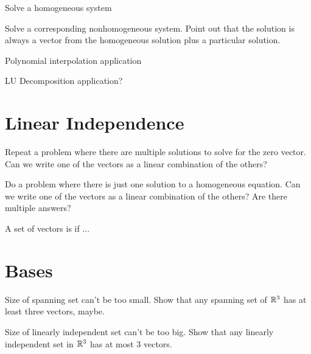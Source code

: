\begin{problemtodo}
  Solve a homogeneous system
\end{problemtodo}

\begin{problemtodo}
  Solve a corresponding nonhomogeneous system.  Point out that the
  solution is always a vector from the homogeneous solution plus a
  particular solution.
\end{problemtodo}

\begin{problemtodo}
  Polynomial interpolation application
\end{problemtodo}

\begin{problemtodo}
  LU Decomposition application?
\end{problemtodo}

\section{Linear Independence}

\begin{problemtodo}
  Repeat a problem where there are multiple solutions to solve for the
  zero vector.  Can we write one of the vectors as a linear
  combination of the others?
\end{problemtodo}

\begin{problemtodo}
  Do a problem where there is just one solution to a homogeneous
  equation.  Can we write one of the vectors as a linear combination
  of the others?  Are there multiple answers?
\end{problemtodo}

\begin{definition}
  A set of vectors is  if ...
\end{definition}

\section{Bases}

\begin{problemtodo}
  Size of spanning set can't be too small.  Show that any spanning set
  of $\mathbb{R}^3$ has at least three vectors, maybe.
\end{problemtodo}

\begin{problemtodo}
  Size of linearly independent set can't be too big.  Show that any
  linearly independent set in $\mathbb{R}^3$ has at most 3 vectors.
\end{problemtodo}

